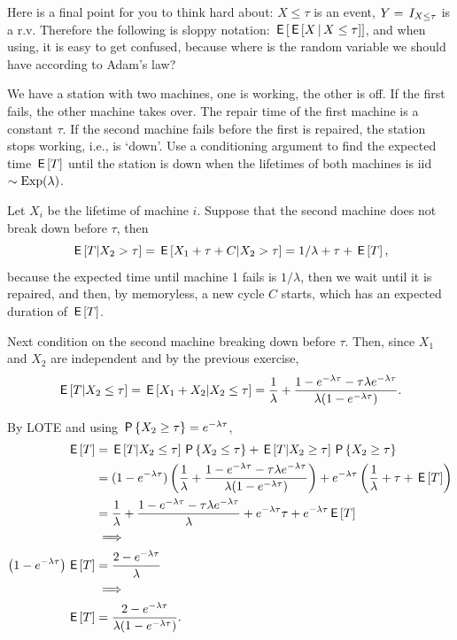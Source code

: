 \documentclass[lectures]{subfiles}
\begin{document}
\begin{exercise}
\begin{solution}
Here is a final point for you to think hard about: ${X\leq \tau}$ is an event, $Y=\1{X \leq \tau}$ is a r.v. Therefore the following is sloppy notation: $\E{\E{X\given X\leq \tau}}$, and when using, it is easy to get confused, because where is the random variable we should have according to Adam's law?
\end{solution}
\end{exercise}


\begin{exercise}
We have a station with two machines, one is working, the other is off.
If the first fails, the other machine takes over.
The repair time of the first machine is a constant $\tau$.
If the second machine fails before the first is repaired, the station stops working, i.e., is `down'.
Use a conditioning argument to find the expected time $\E T$ until the station is down when the lifetimes of both machines is iid $\sim\Exp{\lambda}$.
\begin{solution}
Let $X_i$ be the lifetime of machine $i$. Suppose that  the second machine does not break down before $\tau$, then
\begin{equation}
  \label{eq:27}
\E{T| X_{2}>\tau} = \E{X_{1} + \tau + C |X_2>\tau} = 1/\lambda + \tau + \E T,
\end{equation}
because the expected time until machine 1 fails is $1/\lambda$, then we wait until it is repaired, and then, by memoryless, a new cycle $C$ starts, which has an expected duration of $\E T$.

Next condition on the second machine breaking down before $\tau$. Then, since $X_{1}$ and $X_2$ are independent and by the previous exercise,
\begin{equation}
  \label{eq:27}
\E{T| X_{2}\leq \tau} = \E{X_{1} + X_{2}  |X_2\leq \tau} = \frac{1}{\lambda} + \frac{ 1- e^{-\lambda \tau}- \tau \lambda  e^{-\lambda \tau}}{\lambda(1-e^{-\lambda \tau})}.
\end{equation}

By LOTE and using $\P{X_{2}\geq \tau} = e^{-\lambda \tau}$,
\begin{align}
  \label{eq:24}
\E T
&=
\E{T| X_{2}\leq \tau} \P{X_{2}\leq \tau} + \E{T| X_{2}\geq \tau} \P{X_{2}\geq \tau} \\
&=(1-e^{-\lambda \tau})\left( \frac 1\lambda+
\frac{ 1- e^{-\lambda \tau}- \tau \lambda  e^{-\lambda \tau}}{\lambda(1-e^{-\lambda \tau})} \right)
+e^{-\lambda \tau}\left( \frac{1}{\lambda} + \tau + \E T \right) \\
&=\frac{1}{\lambda} + \frac{ 1- e^{-\lambda \tau}- \tau \lambda  e^{-\lambda \tau}}{\lambda}
+e^{-\lambda \tau} \tau + e^{-\lambda \tau}\E T \\
&\implies \\
\left( 1-e^{-\lambda \tau} \right) \E T
&=\frac{2-e^{-\lambda \tau}}{\lambda} \\
&\implies \\
\E T
&=\frac{2-e^{-\lambda \tau}}{\lambda(1-e^{-\lambda \tau})}.
\end{align}


\end{solution}
\end{exercise}
\end{document}
